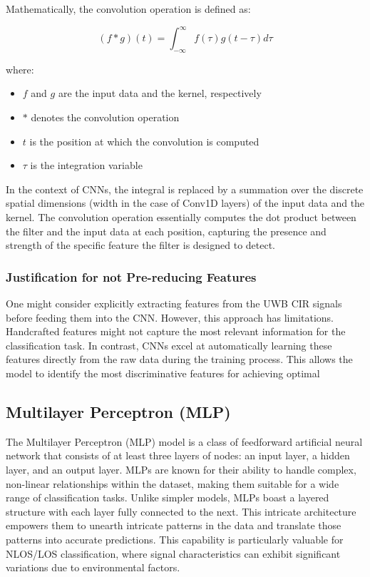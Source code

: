 Mathematically, the convolution operation is defined as:

\begin{equation}
(f * g)(t) = \int_{-\infty}^{\infty} f(\tau)g(t - \tau) d\tau
\end{equation}

where:

\begin{itemize}
  \item $f$ and $g$ are the input data and the kernel, respectively
  \item $*$ denotes the convolution operation
  \item $t$ is the position at which the convolution is computed
  \item $\tau$ is the integration variable
\end{itemize}

In the context of CNNs, the integral is replaced by a summation over the discrete spatial dimensions (width in the case of Conv1D layers) of the input data and the kernel. The convolution operation essentially computes the dot product between the filter and the input data at each position, capturing the presence and strength of the specific feature the filter is designed to detect.

\subsubsection{Justification for not Pre-reducing Features}

One might consider explicitly extracting features from the UWB CIR signals before feeding them into the CNN. However, this approach has limitations. Handcrafted features might not capture the most relevant information for the classification task. In contrast, CNNs excel at automatically learning these features directly from the raw data during the training process. This allows the model to identify the most discriminative features for achieving optimal


\subsection{Multilayer Perceptron (MLP)}\label{mlp}                                                                                 
The Multilayer Perceptron (MLP) model is a class of feedforward artificial neural network that consists of at least three layers of nodes: an input layer, a hidden layer, and an output layer. MLPs are known for their ability to handle complex, non-linear relationships within the dataset, making them suitable for a wide range of classification tasks. Unlike simpler models, MLPs boast a layered structure with each layer fully connected to the next. This intricate architecture empowers them to unearth intricate patterns in the data and translate those patterns into accurate predictions. This capability is particularly valuable for NLOS/LOS classification, where signal characteristics can exhibit significant variations due to environmental factors.

